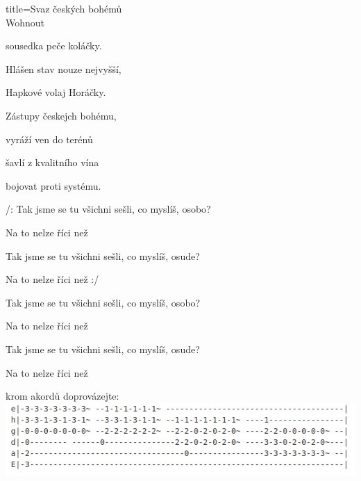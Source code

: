 \begin{song}{title=\predtitle \centering Svaz českých bohémů \\\large Wohnout }
\begin{centerjustified}
sousedka peče koláčky.

Hlášen stav nouze nejvyšší,

Hapkové volaj Horáčky.

Zástupy českejch bohému,

vyráží ven do terénů

šavlí z kvalitního vína

bojovat proti systému.

\sloka
/: Tak jsme se tu všichni sešli, co myslíš, osobo?

Na to nelze říci než 

Tak jsme se tu všichni sešli, co myslíš, osude?

Na to nelze říci než :/

Tak jsme se tu všichni sešli, co myslíš, osobo?

Na to nelze říci než 

Tak jsme se tu všichni sešli, co myslíš, osude?

Na to nelze říci než 

\vspace{1cm}

krom akordů doprovázejte:
\centering
\includegraphics[scale=.75]{../taby/svazceskychbohemu.png}

\end{centerjustified}
\setcounter{Slokočet}{0}
\end{song}
